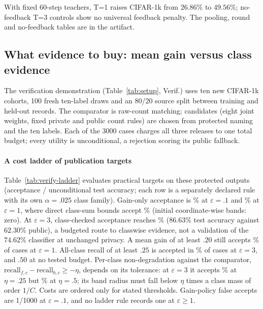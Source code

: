 With fixed 60-step teachers, T=1 raises CIFAR-1k from $26.86\%$ to
$49.56\%$; no-feedback T=3 controls show no universal feedback penalty. The
pooling, round and no-feedback tables are in the artifact.

\subsection{What evidence to buy: mean gain versus class evidence}
\label{sec:eval:verification}

The verification demonstration (Table~\ref{tab:setup}, Verif.) uses ten new
CIFAR-1k cohorts, 100 fresh ten-label draws and an 80/20 source split
between training and held-out records. The comparator is raw-count matching;
candidates (eight joint weights, fixed private and public count rules) are
chosen from protected naming and the ten labels. Each of the 3000 cases
charges all three releases to one total budget; every utility is
unconditional, a rejection scoring its public fallback.

\paragraph{A cost ladder of publication targets}
Table~\ref{tab:verify-ladder} evaluates practical targets on these protected
outputs (acceptance / unconditional test accuracy; each row is a separately
declared rule with its own $\alpha=.025$ class family). Gain-only acceptance is \TightGlobalAccept{}\% at $\varepsilon=.1$
and \MiddleGlobalAccept{}\% at $\varepsilon=1$, where direct class-sum bounds
accept \MiddleClassAccept{}\% (initial coordinate-wise bands: zero). At $\varepsilon=3$, class-checked acceptance reaches
\LargerClassAccept{}\% ($86.63\%$ test accuracy against $62.30\%$ public), a
budgeted route to classwise evidence, not a validation of the $74.62\%$
classifier at unchanged privacy. A mean gain of at least $.20$ still accepts
\LadderGainTwoTenth{}\% of cases at $\varepsilon=1$. All-class recall of at
least $.25$ is accepted in \LadderRecallQuarterThree{}\% of cases at
$\varepsilon=3$, and $.50$ at no tested budget. Per-class non-degradation
against the comparator, $\mathrm{recall}_{f,c}-\mathrm{recall}_{b,c}\ge-\eta$,
depends on its tolerance: at $\varepsilon=3$ it accepts
\LadderNondegQuarter{}\% at $\eta=.25$ but \LadderNondegHalf{}\% at
$\eta=.5$; its band radius must fall below $\eta$ times a class mass of order
$1/C$. Costs are ordered only for stated thresholds. Gain-policy false accepts are 1/1000 at $\varepsilon=.1$, and no ladder rule
records one at $\varepsilon\ge1$.

